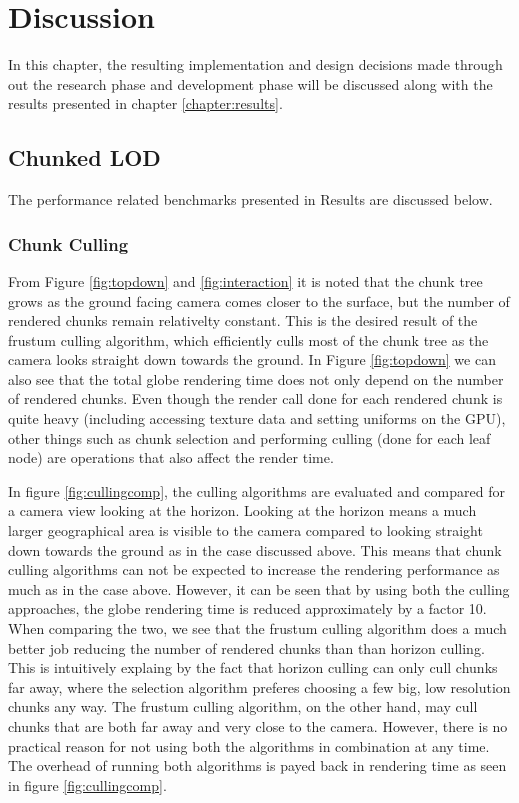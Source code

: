 \chapter{Discussion}
In this chapter, the resulting implementation and design decisions made through out the research phase and development phase will be discussed along with the results presented in chapter \ref{chapter:results}.

\section{Chunked LOD}
The performance related benchmarks presented in Results are discussed below.

\subsection{Chunk Culling}
From Figure \ref{fig:topdown} and \ref{fig:interaction} it is noted that the chunk tree grows as the ground facing camera comes closer to the surface, but the number of rendered chunks remain relativelty constant. 
This is the desired result of the frustum culling algorithm, which efficiently culls most of the chunk tree as the camera looks straight down towards the ground. 
In Figure \ref{fig:topdown} we can also see that the total globe rendering time does not only depend on the number of rendered chunks. 
Even though the render call done for each rendered chunk is quite heavy (including accessing texture data and setting uniforms on the GPU), other things such as chunk selection and performing culling (done for each leaf node) are operations that also affect the render time. 

In figure \ref{fig:cullingcomp}, the culling algorithms are evaluated and compared for a camera view looking at the horizon. 
Looking at the horizon means a much larger geographical area is visible to the camera compared to looking straight down towards the ground as in the case discussed above. 
This means that chunk culling algorithms can not be expected to increase the rendering performance as much as in the case above. 
However, it can be seen that by using both the culling approaches, the globe rendering time is reduced approximately by a factor 10. 
When comparing the two, we see that the frustum culling algorithm does a much better job reducing the number of rendered chunks than than horizon culling. 
This is intuitively explaing by the fact that horizon culling can only cull chunks far away, where the selection algorithm preferes choosing a few big, low resolution chunks any way. 
The frustum culling algorithm, on the other hand, may cull chunks that are both far away and very close to the camera. 
However, there is no practical reason for not using both the algorithms in combination at any time. 
The overhead of running both algorithms is payed back in rendering time as seen in figure \ref{fig:cullingcomp}.

